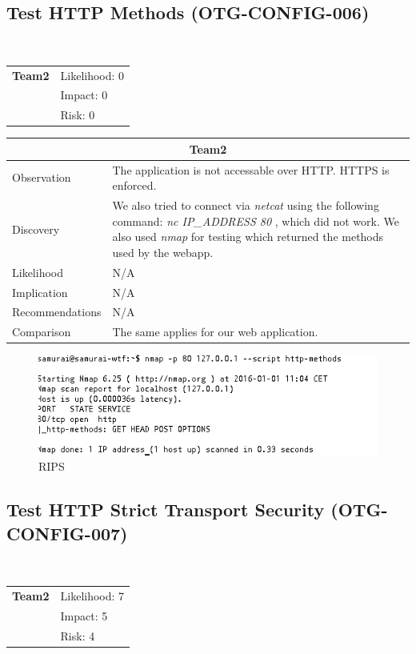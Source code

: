 \documentclass[headsepline,footsepline,footinclude=false,oneside,fontsize=11pt,paper=a4,listof=totoc,bibliography=totoc]{scrbook} %
\begin{document}
\subsection{Test HTTP Methods (OTG-CONFIG-006)}\


\begin{tabular}{cR{12cm}}
	\textbf{Team2} & Likelihood: 0\\& Impact: 0\\& Risk: 0
\end{tabular}

\begin{tabular}{ l|p{11cm}  }
	\hline
	\multicolumn{2}{c}{\textbf{Team2}} \\
	\hline
	Observation   &  The application is not accessable over HTTP. HTTPS is enforced.  \\
	Discovery  &  We also tried to connect via \textit{netcat} using the following command: \textit{{nc IP\_ADDRESS 80}} , which did not work. We also used \textit{nmap} for testing which returned the methods used by the webapp.\\

	Likelihood & N/A \\
	Implication    & N/A \\
	Recommendations & N/A \\
	Comparison &  The same applies for our web application.\\
	\hline
\end{tabular}

\begin{figure}[H]
	\centering
	\includegraphics[width=150mm]{logos/nmap.jpg}
	\caption{RIPS \label{overflow}}
\end{figure} 

\pagebreak
\subsection{Test HTTP Strict Transport Security (OTG-CONFIG-007)}\
\begin{tabular}{cR{12cm}}
	\textbf{Team2} & Likelihood: 7\\& Impact: 5\\& Risk: 4
\end{tabular}
\end{document}
